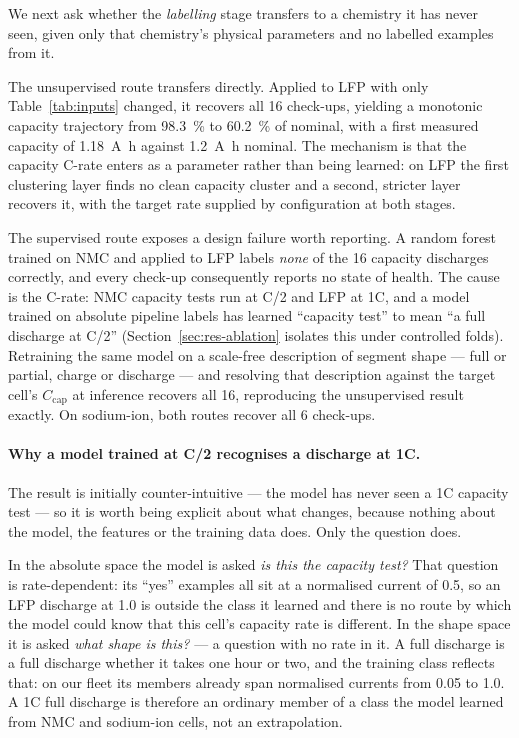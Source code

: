 \documentclass[preprint,3p,number]{elsarticle}
\begin{document}
We next ask whether the \emph{labelling} stage transfers to a chemistry it has
never seen, given only that chemistry's physical parameters and no labelled
examples from it.

The unsupervised route transfers directly. Applied to LFP with only
Table~\ref{tab:inputs} changed, it recovers all \num{16} check-ups, yielding a
monotonic capacity trajectory from \SI{98.3}{\percent} to \SI{60.2}{\percent} of
nominal, with a first measured capacity of \SI{1.18}{\ampere\hour} against
\SI{1.2}{\ampere\hour} nominal. The mechanism is that the capacity C-rate enters
as a parameter rather than being learned: on LFP the first clustering layer
finds no clean capacity cluster and a second, stricter layer recovers it, with
the target rate supplied by configuration at both stages.

The supervised route exposes a design failure worth reporting. A random forest
trained on NMC and applied to LFP labels \emph{none} of the \num{16} capacity
discharges correctly, and every check-up consequently reports no state of
health. The cause is the C-rate: NMC capacity tests run
at C/2 and LFP at 1C, and a model trained on absolute pipeline labels has
learned ``capacity test'' to mean ``a full discharge at C/2''
(Section~\ref{sec:res-ablation} isolates this under controlled folds).
Retraining the
same model on a scale-free description of segment shape --- full or partial,
charge or discharge --- and resolving that description against the target cell's
$C_{\mathrm{cap}}$ at inference recovers all \num{16}, reproducing the
unsupervised result exactly. On sodium-ion, both routes recover all \num{6}
check-ups.

\paragraph{Why a model trained at C/2 recognises a discharge at 1C.} The
result is initially counter-intuitive --- the model has never seen a 1C capacity
test --- so it is worth being explicit about what changes, because nothing about
the model, the features or the training data does. Only the question does.

In the absolute space the model is asked \emph{is this the capacity test?} That
question is rate-dependent: its ``yes'' examples all sit at a normalised current
of \num{0.5}, so an LFP discharge at \num{1.0} is outside the class it learned
and there is no route by which the model could know that this cell's capacity
rate is different. In the shape space it is asked \emph{what shape is this?} ---
a question with no rate in it. A full discharge is a full discharge whether it
takes one hour or two, and the training class reflects that: on our fleet its
members already span normalised currents from \num{0.05} to \num{1.0}. A 1C full
discharge is therefore an ordinary member of a class the model learned from NMC
and sodium-ion cells, not an extrapolation.
\end{document}
